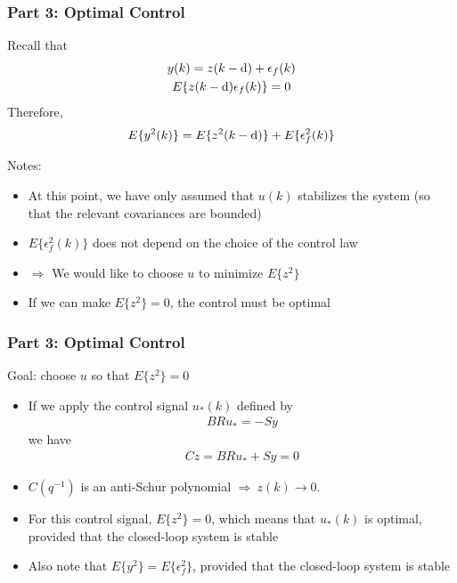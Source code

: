 \begin{frame}
    \frametitle{Part 3: Optimal Control}

    Recall that
    \begin{gather*}
        y(k) = z(k-\textrm{d}) + \epsilon_f(k) \\
        E\{z(k-\textrm{d})\epsilon_f(k)\} = 0
    \end{gather*}
    \paused
    Therefore,
    \begin{align*}
        E\{y^2(k)\} = E\{z^2(k-\textrm{d})\} + E\{\epsilon_f^2(k)\}
    \end{align*}
    \paused

    Notes:
    \begin{itemize}
        \item
        At this point, we have only assumed that $u(k)$ stabilizes the system (so that the relevant covariances are bounded)
        \pause

        \item
        $E\{\epsilon_f^2(k)\}$ does not depend on the choice of the control law
        \pause

        \item
        $\Rightarrow$ We would like to choose $u$ to minimize $E\{z^2\}$
        \pause

        \item
        If we can make $E\{z^2\} = 0$, the control must be optimal
    \end{itemize}

\end{frame}

\begin{frame}
    \frametitle{Part 3: Optimal Control}

    Goal: choose $u$ so that $E\{z^2\} = 0$
    \pause

    \begin{itemize}
        \item
        If we apply the control signal $u_*(k)$ defined by
        \begin{align*}
            BRu_* = - Sy
        \end{align*}
        \paused
        we have
        \begin{align*}
            Cz = BRu_* + Sy = 0
        \end{align*}
        \paused

        \item
        $C(q^{-1})$ is an anti-Schur polynomial $\Rightarrow \ z(k) \longrightarrow 0$.
        \pause

        \item
        For this control signal, $E\{z^2\} = 0$, which means that $u_*(k)$ is optimal, provided that the closed-loop system is stable
        \pause

        \item
        Also note that $E\{y^2\} = E\{\epsilon_f^2\}$, provided that the closed-loop system is stable
    \end{itemize}
\end{frame}

